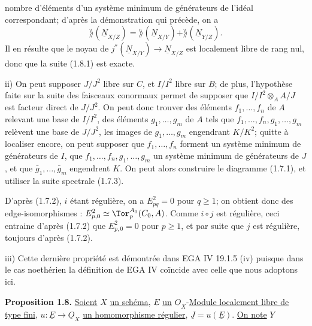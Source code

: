 
nombre d'éléments d'un système minimum de générateurs de l'idéal correspondant; d'après la démonstration qui précède, on a
\[
 \rang(\underline{N}_{X/Z})=\rang(\underline{N}_{X/Y})+\rang(\underline{N}_{Y/Z}).
\]
Il en résulte que le noyau de $j^*(\underline{N}_{X/Y})\longrightarrow \underline{N}_{X/Z}$ est localement libre de rang nul, donc que la suite (1.8.1) est exacte.

ii) On peut supposer $J/J^2$ libre sur $C$, et $I/I^2$ libre sur $B$; de plus, l'hypothèse faite sur la suite des faisceaux conormaux permet de supposer que $I/I^2\otimes_A A/J$ est facteur direct de $J/J^2$. On peut donc trouver des éléments $f_1,\ldots,f_n$ de $A$ relevant une base de $I/I^2$, des éléments $g_1,\ldots,g_m$ de $A$ tels que $f_1,\ldots,f_n,g_1,\ldots,g_m$ relèvent une base de $J/J^2$, les images de $g_1,\ldots,g_m$ engendrant $K/K^2$; quitte à localiser encore, on peut supposer que $f_1,\ldots,f_n$ forment un système minimum de générateurs de $I$, que $f_1,\ldots,f_n,g_1,\ldots,g_m$ un système minimum de générateurs de $J$, et que $\bar g_1,\ldots,\bar g_m$ engendrent $K$. On peut alors construire le diagramme (1.7.1), et utiliser la suite spectrale (1.7.3).

D'après (1.7.2), $i$ étant régulière, on a $E^2_{pq}=0$ pour $q\geq1$; on obtient donc des edge-isomorphismes : $E^2_{p,0}\simeq\Tor_p^{A_0}(C_0,A)$. Comme $i\circ j$ est régulière, ceci entraine d'après (1.7.2) que $E^2_{p,0}=0$ pour $p\geq1$, et par suite que $j$ est régulière, toujours d'après (1.7.2).

iii) Cette dernière propriété est démontrée dans EGA IV 19.1.5 (iv) puisque dans le cas noethérien la définition de EGA IV coïncide avec celle que nous adoptons ici.

\textbf{Proposition 1.8.} \uline{Soient} \(X\) \uline{un schéma}, \(\underline{E}\) \uline{un} \(\underline{O}_X\)-\uline{Module localement libre de type fini}, \(u:\underline{E}\to\underline{O}_X\) \uline{un homomorphisme régulier}, \(\underline{J}=u(\underline{E})\). \uline{On note} \(Y\)

